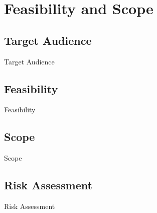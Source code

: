 \section{Feasibility and Scope}

\subsection{Target Audience}
\begin{frame}{Target Audience}

\end{frame}

\subsection{Feasibility}
\begin{frame}{Feasibility}

\end{frame}

\subsection{Scope}
\begin{frame}{Scope}

\end{frame}

\subsection{Risk Assessment}
\begin{frame}{Risk Assessment}

\end{frame}
